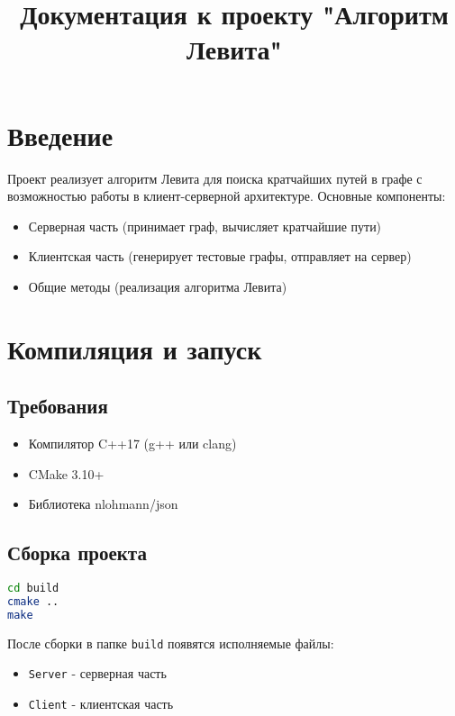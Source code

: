 \documentclass{article}
\title{Документация к проекту "Алгоритм Левита"}
\author{}
\date{}
\begin{document}
\maketitle

\section{Введение}
Проект реализует алгоритм Левита для поиска кратчайших путей в графе с возможностью работы в клиент-серверной архитектуре. Основные компоненты:

\begin{itemize}
    \item Серверная часть (принимает граф, вычисляет кратчайшие пути)
    \item Клиентская часть (генерирует тестовые графы, отправляет на сервер)
    \item Общие методы (реализация алгоритма Левита)
\end{itemize}

\section{Компиляция и запуск}

\subsection{Требования}
\begin{itemize}
    \item Компилятор C++17 (g++ или clang)
    \item CMake 3.10+
    \item Библиотека nlohmann/json
\end{itemize}

\subsection{Сборка проекта}
\begin{lstlisting}[language=bash]
cd build
cmake ..
make
\end{lstlisting}

После сборки в папке \texttt{build} появятся исполняемые файлы:
\begin{itemize}
    \item \texttt{Server} - серверная часть
    \item \texttt{Client} - клиентская часть
\end{itemize}
\end{document}
